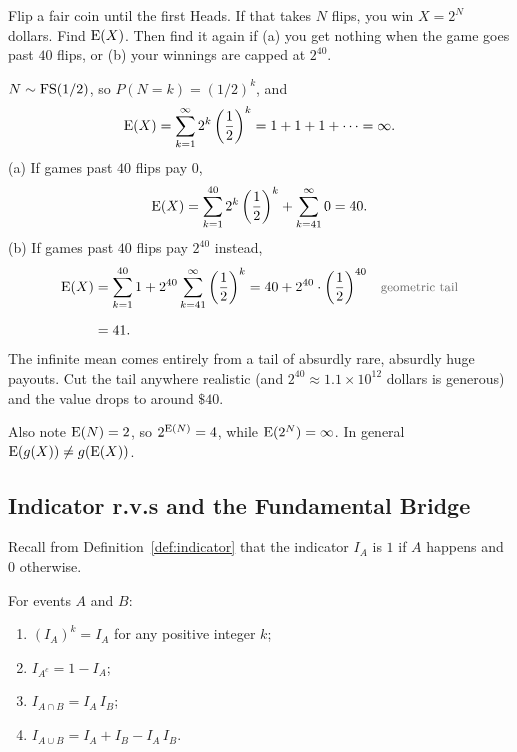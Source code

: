 \bigskip

\begin{example}\label{ex:stpete}
Flip a fair coin until the first Heads. If that takes $N$ flips, you win $X = 2^{N}$ dollars. Find $\operatorname{E}(X)$. Then find it again if (a) you get nothing when the game goes past $40$ flips, or (b) your winnings are capped at $2^{40}$.
\end{example}

\medskip

\begin{solution}
$N \sim \operatorname{FS}(1/2)$, so $P(N = k) = (1/2)^{k}$, and
\medskip
\[
\operatorname{E}(X) = \sum_{k=1}^{\infty} 2^{k} \left(\frac{1}{2}\right)^{k} = 1 + 1 + 1 + \cdots = \infty.
\]
\medskip
(a) If games past $40$ flips pay $0$,
\medskip
\[
\operatorname{E}(X) = \sum_{k=1}^{40} 2^{k} \left(\frac{1}{2}\right)^{k} + \sum_{k=41}^{\infty} 0 = 40.
\]
\medskip
(b) If games past $40$ flips pay $2^{40}$ instead,
\medskip
\begin{align*}
\E(X)
  &= \sum_{k=1}^{40} 1 + 2^{40} \sum_{k=41}^{\infty} \left(\frac{1}{2}\right)^{k}
   = 40 + 2^{40} \cdot \left(\frac{1}{2}\right)^{40}
  && \by{geometric tail} \\[0.6em]
  &= 41.
\end{align*}
\medskip
The infinite mean comes entirely from a tail of absurdly rare, absurdly huge payouts. Cut the tail anywhere realistic (and $2^{40} \approx 1.1 \times 10^{12}$ dollars is generous) and the value drops to around $\$40$.

\medskip

Also note $\operatorname{E}(N) = 2$, so $2^{\operatorname{E}(N)} = 4$, while $\operatorname{E}(2^{N}) = \infty$. In general $\operatorname{E}(g(X)) \ne g(\operatorname{E}(X))$.
\end{solution}

\bigskip

\subsection{Indicator r.v.s and the Fundamental Bridge}

\bigskip

Recall from Definition~\ref{def:indicator} that the indicator $I_A$ is $1$ if $A$ happens and $0$ otherwise.

\bigskip

\begin{theorem}\label{thm:indprops}
For events $A$ and $B$:
\medskip
\begin{enumerate}
  \setlength{\itemsep}{0.4em}
  \item $(I_A)^{k} = I_A$ for any positive integer $k$;
  \item $I_{A^c} = 1 - I_A$;
  \item $I_{A \cap B} = I_A\, I_B$;
  \item $I_{A \cup B} = I_A + I_B - I_A\, I_B$.
\end{enumerate}
\end{theorem}


